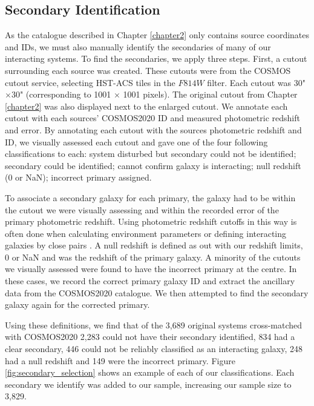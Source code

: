 \subsection{Secondary Identification}\label{sec:sec-ident}
\noindent As the catalogue described in Chapter \ref{chapter2} only contains source coordinates and IDs, we must also manually identify the secondaries of many of our interacting systems. To find the secondaries, we apply three steps. First, a cutout surrounding each source was created. These cutouts were from the COSMOS cutout service, selecting HST-ACS tiles in the $F814W$ filter. Each cutout was 30"$\times$30" (corresponding to 1001 $\times$ 1001 pixels). The original cutout from Chapter \ref{chapter2} was also displayed next to the enlarged cutout. We annotate each cutout with each sources' COSMOS2020 ID and measured photometric redshift and error. By annotating each cutout with the sources photometric redshift and ID, we visually assessed each cutout and gave one of the four following classifications to each: system disturbed but secondary could not be identified; secondary could be identified; cannot confirm galaxy is interacting; null redshift (0 or NaN); incorrect primary assigned. 

To associate a secondary galaxy for each primary, the galaxy had to be within the cutout we were visually assessing and within the recorded error of the primary photometric redshift. Using photometric redshift cutoffs in this way is often done when calculating environment parameters \citep[e.g][]{2006MNRAS.373..469B} or defining interacting galaxies by close pairs \citep[e.g][]{2022ApJ...940....4S}. A null redshift is defined as out with our redshift limits, 0 or NaN and was the redshift of the primary galaxy. A minority of the cutouts we visually assessed were found to have the incorrect primary at the centre. In these cases, we record the correct primary galaxy ID and extract the ancillary data from the COSMOS2020 catalogue. We then attempted to find the secondary galaxy again for the corrected primary.

Using these definitions, we find that of the 3,689 original systems cross-matched with COSMOS2020 2,283 could not have their secondary identified, 834 had a clear secondary, 446 could not be reliably classified as an interacting galaxy, 248 had a null redshift and 149 were the incorrect primary. Figure \ref{fig:secondary_selection} shows an example of each of our classifications. Each secondary we identify was added to our sample, increasing our sample size to 3,829.

